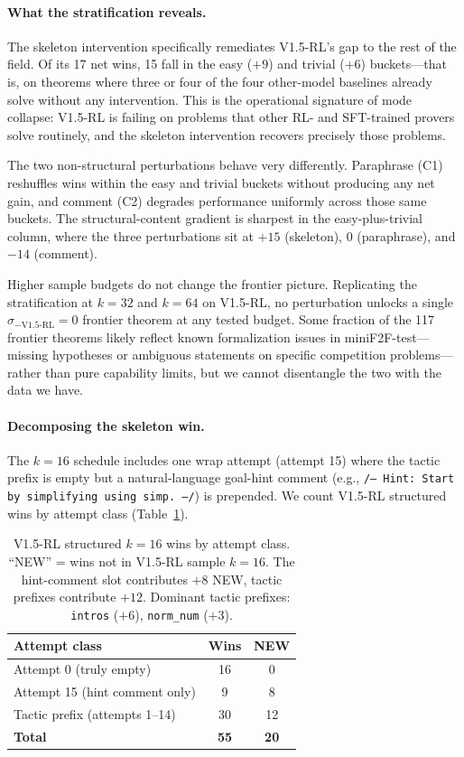\documentclass{article}
\begin{document}
\paragraph{What the stratification reveals.}
The skeleton intervention specifically remediates V1.5-RL's gap to the rest of the field. Of its 17 net wins, 15 fall in the easy ($+9$) and trivial ($+6$) buckets---that is, on theorems where three or four of the four other-model baselines already solve without any intervention. This is the operational signature of mode collapse: V1.5-RL is failing on problems that other RL- and SFT-trained provers solve routinely, and the skeleton intervention recovers precisely those problems.

The two non-structural perturbations behave very differently. Paraphrase (C1) reshuffles wins within the easy and trivial buckets without producing any net gain, and comment (C2) degrades performance uniformly across those same buckets. The structural-content gradient is sharpest in the easy-plus-trivial column, where the three perturbations sit at $+15$ (skeleton), $0$ (paraphrase), and $-14$ (comment).

Higher sample budgets do not change the frontier picture. Replicating the stratification at $k{=}32$ and $k{=}64$ on V1.5-RL, no perturbation unlocks a single $\sigma_{-\text{V1.5-RL}}{=}0$ frontier theorem at any tested budget. Some fraction of the 117 frontier theorems likely reflect known formalization issues in miniF2F-test---missing hypotheses or ambiguous statements on specific competition problems---rather than pure capability limits, but we cannot disentangle the two with the data we have.

\paragraph{Decomposing the skeleton win.}
The $k{=}16$ schedule includes one wrap attempt (attempt 15) where the tactic prefix is empty but a natural-language goal-hint comment (e.g., \texttt{/-- Hint: Start by simplifying using simp. --/}) is prepended. We count V1.5-RL structured wins by attempt class (Table~\ref{tab:attempt_class}).

\begin{table}[t]
\centering
\small
\begin{tabular}{lcc}
\toprule
\textbf{Attempt class} & \textbf{Wins} & \textbf{NEW} \\
\midrule
Attempt 0 (truly empty)           & 16 & 0  \\
Attempt 15 (hint comment only)    & 9  & 8  \\
Tactic prefix (attempts 1--14)    & 30 & 12 \\
\midrule
\textbf{Total}                    & \textbf{55} & \textbf{20} \\
\bottomrule
\end{tabular}
\caption{V1.5-RL structured $k{=}16$ wins by attempt class. ``NEW'' = wins not in V1.5-RL sample $k{=}16$. The hint-comment slot contributes $+8$ NEW, tactic prefixes contribute $+12$. Dominant tactic prefixes: \texttt{intros} ($+6$), \texttt{norm\_num} ($+3$).}
\label{tab:attempt_class}
\end{table}
\end{document}
